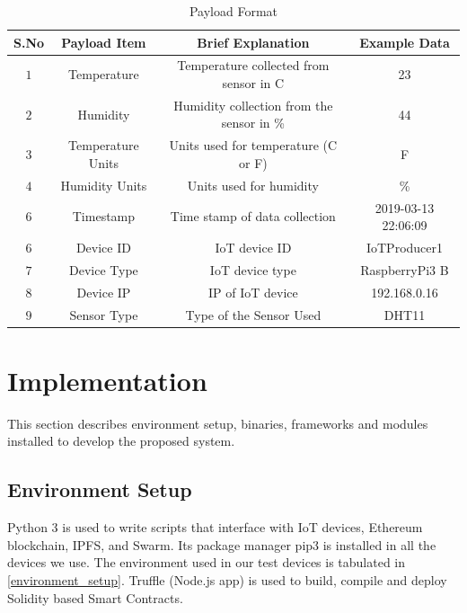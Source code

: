 \documentclass[11pt,openright]{report}
\begin{document}
\begin{table}[!htbp]
    \renewcommand{\arraystretch}{1.3}
    \caption{Payload Format}
    \label{payload_format}
    \centering
    \begin{tabular}{|c|c|c|c|}
        \hline
        \bfseries S.No & \bfseries Payload Item & \bfseries Brief Explanation & \bfseries Example Data \\
        \hline\hline
        $1$ & Temperature & Temperature collected from sensor in C & 23 \\ \hline
        $2$ & Humidity & Humidity collection from the sensor in \% & 44 \\ \hline
        $3$ & Temperature Units & Units used for temperature (C or F) & F \\ \hline
        $4$ & Humidity Units & Units used for humidity & \% \\ \hline
        $6$ & Timestamp & Time stamp of data collection & 2019-03-13 22:06:09 \\ \hline
        $6$ & Device ID & IoT device ID & IoTProducer1 \\ \hline
        $7$ & Device Type & IoT device type & RaspberryPi3 B \\ \hline
        $8$ & Device IP & IP of IoT device& 192.168.0.16 \\ \hline
        $9$ & Sensor Type & Type of the Sensor Used & DHT11 \\ \hline
    \end{tabular}
\end{table}


\section{Implementation}
This section describes environment setup, binaries, frameworks and modules installed to develop the proposed system.
\subsection{Environment Setup}
Python 3 is used to write scripts that interface with IoT devices, Ethereum blockchain, IPFS, and Swarm. Its package manager pip3 is installed in all the devices we use. The environment used in our test devices is tabulated in \ref{environment_setup}. Truffle (Node.js app) is used to build, compile and deploy Solidity based Smart Contracts. 
\end{document}
